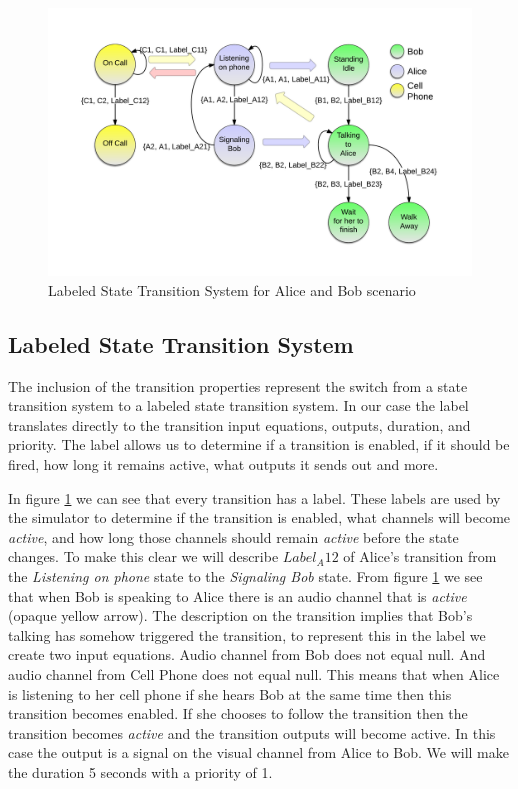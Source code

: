 \begin{figure}[h]
\begin{center}
\includegraphics[width=\textwidth]{ab_lsts.png}
\caption{Labeled State Transition System for Alice and Bob scenario}
\label{fig:ab_lsts}
\end{center}
\end{figure}

\subsection{Labeled State Transition System}
The inclusion of the transition properties represent the switch from a state transition system to a labeled state transition system.  In our case the label translates directly to the transition input equations, outputs, duration, and priority.  The label allows us to determine if a transition is enabled, if it should be fired, how long it remains active, what outputs it sends out and more.  

In figure \ref{fig:ab_lsts} we can see that every transition has a label.  These labels are used by the simulator to determine if the transition is enabled, what channels will become {\em active}, and how long those channels should remain {\em active} before the state changes.  To make this clear we will describe $Label_A12$ of Alice's transition from the {\em Listening on phone} state to the {\em Signaling Bob} state.  From figure \ref{fig:ab_lsts} we see that when Bob is speaking to Alice there is an audio channel that is {\em active} (opaque yellow arrow).  The description on the transition implies that Bob's talking has somehow triggered the transition, to represent this in the label we create two input equations.  Audio channel from Bob does not equal null.  And audio channel from Cell Phone does not equal null.  This means that when Alice is listening to her cell phone if she hears Bob at the same time then this transition becomes enabled.  If she chooses to follow the transition then the transition becomes {\em active} and the transition outputs will become active.  In this case the output is a signal on the visual channel from Alice to Bob.  We will make the duration 5 seconds with a priority of 1.  

